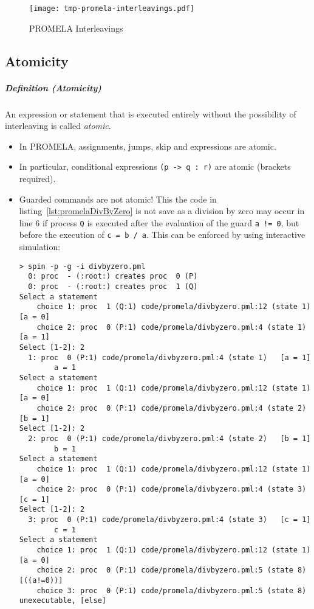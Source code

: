 \documentclass[a4paper, 11pt, accentcolor = tud3b]{tudreport}
\newcommand{\inlinePromela}[1]{\lstinline[language = PROMELA]|#1|}
\newcommand{\definition}[2]{\subparagraph{Definition (#1)} \begin{adjustwidth}{2cm}{} #2 \end{adjustwidth}}
\begin{document}
					\begin{figure}
						\centering
						\texttt{[image: tmp-promela-interleavings.pdf]}
						\caption{PROMELA Interleavings}
						\label{fig:promelaInterleaving}
					\end{figure}

			\subsection{Atomicity}
				\definition{Atomicity}{An expression or statement that is executed entirely without the possibility of interleaving is called \textit{atomic}.}
				
				\begin{itemize}
					\item In PROMELA, assignments, jumps, skip and expressions are atomic.
					\item In particular, conditional expressions \inlinePromela{(p -> q : r)} are atomic (brackets required).
					\item Guarded commands are not atomic! This the code in listing~\ref{lst:promelaDivByZero} is not save as a division by zero may occur in line 6 if process \inlinePromela{Q} is executed after the evaluation of the guard \inlinePromela{a != 0}, but before the execution of \inlinePromela{c = b / a}. This can be enforced by using interactive simulation:
						\begin{lstlisting}[numbers = none]
> spin -p -g -i divbyzero.pml
  0: proc  - (:root:) creates proc  0 (P)
  0: proc  - (:root:) creates proc  1 (Q)
Select a statement
	choice 1: proc  1 (Q:1) code/promela/divbyzero.pml:12 (state 1) [a = 0]
	choice 2: proc  0 (P:1) code/promela/divbyzero.pml:4 (state 1) [a = 1]
Select [1-2]: 2
  1: proc  0 (P:1) code/promela/divbyzero.pml:4 (state 1)	[a = 1]
		a = 1
Select a statement
	choice 1: proc  1 (Q:1) code/promela/divbyzero.pml:12 (state 1) [a = 0]
	choice 2: proc  0 (P:1) code/promela/divbyzero.pml:4 (state 2) [b = 1]
Select [1-2]: 2
  2: proc  0 (P:1) code/promela/divbyzero.pml:4 (state 2)	[b = 1]
		b = 1
Select a statement
	choice 1: proc  1 (Q:1) code/promela/divbyzero.pml:12 (state 1) [a = 0]
	choice 2: proc  0 (P:1) code/promela/divbyzero.pml:4 (state 3) [c = 1]
Select [1-2]: 2
  3: proc  0 (P:1) code/promela/divbyzero.pml:4 (state 3)	[c = 1]
		c = 1
Select a statement
	choice 1: proc  1 (Q:1) code/promela/divbyzero.pml:12 (state 1) [a = 0]
	choice 2: proc  0 (P:1) code/promela/divbyzero.pml:5 (state 8) [((a!=0))]
	choice 3: proc  0 (P:1) code/promela/divbyzero.pml:5 (state 8) unexecutable, [else]

\end{lstlisting}
\end{itemize}
\end{document}
